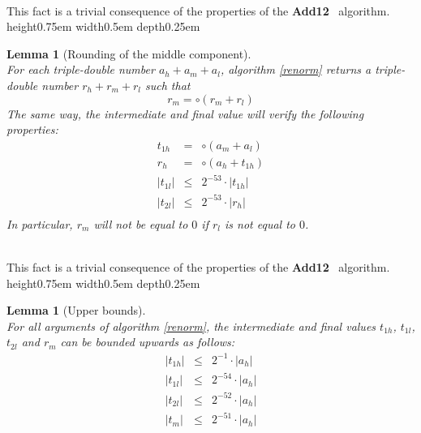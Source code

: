 \documentclass[a4paper,10pt,twoside]{article}
\newtheorem{lemma}[theorem]{Lemma}
\newenvironment{proof}[1][Proof]{\begin{trivlist}
\item[\hskip \labelsep {\bfseries #1}]}{\end{trivlist}}
\newcommand{\qed}{\nobreak \ifvmode \relax \else \ifdim \lastskip<1.5em \hskip-\lastskip
\hskip1.5em plus0em minus0.5em \fi \nobreak \vrule height0.75em width0.5em depth0.25em\fi}
\newcommand{\hi}{\ensuremath{\mathit{h}}}
\newcommand{\mi}{\ensuremath{\mathit{m}}}
\newcommand{\lo}{\ensuremath{\mathit{l}}}
\newcommand{\Add}{{\bf Add12}}
\begin{document}
\begin{proof} ~\\
This fact is a trivial consequence of the properties of the \Add~ algorithm. \qed
\end{proof}
\begin{lemma}[Rounding of the middle component] \label{properties}~\\
For each triple-double number $a_\hi + a_\mi + a_\lo$, algorithm \ref{renorm}
returns a triple-double number $r_\hi + r_\mi + r_\lo$ such that
$$r_\mi = \circ \left( r_\mi + r_\lo \right)$$
The same way, the intermediate and final value will verify the following properties:
\begin{eqnarray*}
t_{1\hi} & = & \circ \left( a_\mi + a_\lo \right) \\
r_\hi & = & \circ \left( a_\hi + t_{1\hi} \right) \\
\left \vert t_{1\lo} \right \vert & \leq & 2^{-53} \cdot \left \vert t_{1\hi} \right \vert \\
\left \vert t_{2\lo} \right \vert & \leq & 2^{-53} \cdot \left \vert r_\hi \right \vert \\
\end{eqnarray*}
In particular, $r_\mi$ will not be equal to $0$ if $r_\lo$ is not equal to $0$.
\end{lemma}
\begin{proof} ~\\
This fact is a trivial consequence of the properties of the \Add~ algorithm. \qed
\end{proof}
\begin{lemma}[Upper bounds] \label{major}~\\
For all arguments of algorithm \ref{renorm},
the intermediate and final values
$t_{1\hi}$, $t_{1\lo}$, $t_{2\lo}$ and $r_\mi$
can be bounded upwards as follows:
\begin{eqnarray*}
\left \vert t_{1\hi} \right \vert & \leq & 2^{-1} \cdot \left \vert a_\hi \right \vert \\
\left \vert t_{1\lo} \right \vert & \leq & 2^{-54} \cdot \left \vert a_\hi \right \vert \\
\left \vert t_{2\lo} \right \vert & \leq & 2^{-52} \cdot \left \vert a_\hi \right \vert \\
\left \vert t_\mi \right \vert & \leq & 2^{-51} \cdot \left \vert a_\hi \right \vert
\end{eqnarray*}
\end{lemma}
\end{document}
